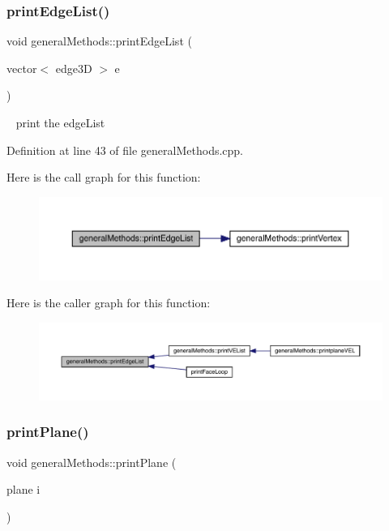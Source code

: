 \subsubsection{\texorpdfstring{print\+Edge\+List()}{printEdgeList()}}
{\footnotesize\ttfamily void general\+Methods\+::print\+Edge\+List (\begin{DoxyParamCaption}\item[{vector$<$ edge3D $>$}]{e }\end{DoxyParamCaption})}

~\newline
print the edge\+List

Definition at line 43 of file general\+Methods.\+cpp.

Here is the call graph for this function\+:
\nopagebreak
\begin{figure}[H]
\begin{center}
\leavevmode
\includegraphics[width=350pt]{namespacegeneral_methods_ab6b6f8a5d92b39ead6c97ec0917b75a4_cgraph}
\end{center}
\end{figure}
Here is the caller graph for this function\+:
\nopagebreak
\begin{figure}[H]
\begin{center}
\leavevmode
\includegraphics[width=350pt]{namespacegeneral_methods_ab6b6f8a5d92b39ead6c97ec0917b75a4_icgraph}
\end{center}
\end{figure}
\mbox{\label{namespacegeneral_methods_a2decb2a442ba211e255e3b212f6ee041}} 
\subsubsection{\texorpdfstring{print\+Plane()}{printPlane()}}
{\footnotesize\ttfamily void general\+Methods\+::print\+Plane (\begin{DoxyParamCaption}\item[{plane}]{i }\end{DoxyParamCaption})}



